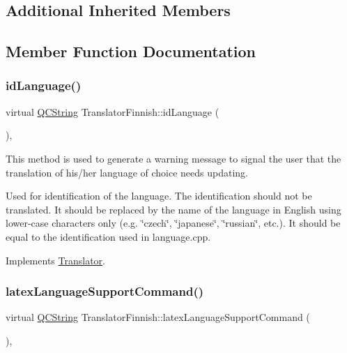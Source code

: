 \subsection*{Additional Inherited Members}


\subsection{Member Function Documentation}
\mbox{\label{class_translator_finnish_a406d2dd6193f6e7a5baa24f64b2259b2}} 
\subsubsection{\texorpdfstring{idLanguage()}{idLanguage()}}
{\footnotesize\ttfamily virtual \mbox{\hyperlink{class_q_c_string}{Q\+C\+String}} Translator\+Finnish\+::id\+Language (\begin{DoxyParamCaption}{ }\end{DoxyParamCaption})\hspace{0.3cm}{\ttfamily [inline]}, {\ttfamily [virtual]}}

This method is used to generate a warning message to signal the user that the translation of his/her language of choice needs updating.

Used for identification of the language. The identification should not be translated. It should be replaced by the name of the language in English using lower-\/case characters only (e.\+g. \char`\"{}czech\char`\"{}, \char`\"{}japanese\char`\"{}, \char`\"{}russian\char`\"{}, etc.). It should be equal to the identification used in language.\+cpp. 

Implements \mbox{\hyperlink{class_translator}{Translator}}.

\mbox{\label{class_translator_finnish_afcf7f54c28497c8bbe3eea0cd19c260f}} 
\subsubsection{\texorpdfstring{latexLanguageSupportCommand()}{latexLanguageSupportCommand()}}
{\footnotesize\ttfamily virtual \mbox{\hyperlink{class_q_c_string}{Q\+C\+String}} Translator\+Finnish\+::latex\+Language\+Support\+Command (\begin{DoxyParamCaption}{ }\end{DoxyParamCaption})\hspace{0.3cm}{\ttfamily [inline]}, {\ttfamily [virtual]}}

